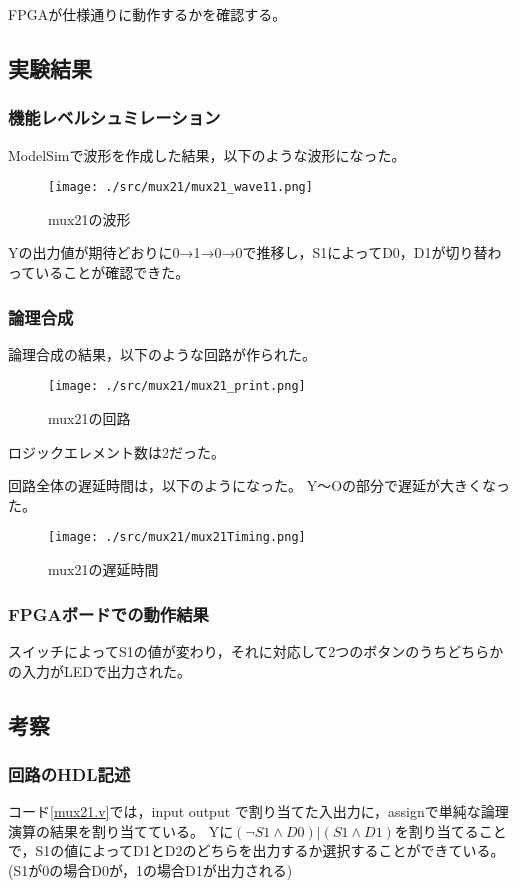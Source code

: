 FPGAが仕様通りに動作するかを確認する。

\subsection{実験結果}
\subsubsection{機能レベルシュミレーション}
ModelSimで波形を作成した結果，以下のような波形になった。

\begin{figure}[H]
  \centering
  \texttt{[image: ./src/mux21/mux21\_wave11.png]}
  \caption{mux21の波形}
\end{figure}

Yの出力値が期待どおりに0→1→0→0で推移し，S1によってD0，D1が切り替わっていることが確認できた。

\subsubsection{論理合成}
論理合成の結果，以下のような回路が作られた。

\begin{figure}[H]
  \centering
  \texttt{[image: ./src/mux21/mux21\_print.png]}
  \caption{mux21の回路}
\end{figure}

ロジックエレメント数は2だった。

回路全体の遅延時間は，以下のようになった。
Y～Oの部分で遅延が大きくなった。

\begin{figure}[H]
  \centering
  \texttt{[image: ./src/mux21/mux21Timing.png]}
  \caption{mux21の遅延時間}
\end{figure}

\subsubsection{FPGAボードでの動作結果}
スイッチによってS1の値が変わり，それに対応して2つのボタンのうちどちらかの入力がLEDで出力された。

\subsection{考察}
\subsubsection{回路のHDL記述}
コード\ref{mux21.v}では，input output で割り当てた入出力に，assignで単純な論理演算の結果を割り当てている。
Yに$(\lnot{S1} \land D0)|(S1 \land D1)$を割り当てることで，S1の値によってD1とD2のどちらを出力するか選択することができている。
(S1が0の場合D0が，1の場合D1が出力される)

